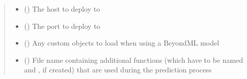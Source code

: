 \documentclass[letterpaper,10pt,english]{sphinxmanual}
\begin{document}
\begin{fulllineitems}
\begin{quote}
\begin{description}
\begin{itemize}
\item {} 
\sphinxAtStartPar
{} (\sphinxstyleliteralemphasis{\sphinxupquote{ (}}\sphinxstyleliteralemphasis{\sphinxupquote{)}}) \textendash{} The host to deploy to

\item {} 
\sphinxAtStartPar
{} (\sphinxstyleliteralemphasis{\sphinxupquote{ (}}\sphinxstyleliteralemphasis{\sphinxupquote{)}}) \textendash{} The port to deploy to

\item {} 
\sphinxAtStartPar
{} (\sphinxstyleliteralemphasis{\sphinxupquote{ (}}\sphinxstyleliteralemphasis{\sphinxupquote{)}}) \textendash{} Any custom objects to load when using a BeyondML model

\item {} 
\sphinxAtStartPar
{} (\sphinxstyleliteralemphasis{\sphinxupquote{ (}}\sphinxstyleliteralemphasis{\sphinxupquote{)}}) \textendash{} File name containing additional functions (which have to be named  and , if created)
that are used during the prediction process

\end{itemize}

\end{description}\end{quote}

\end{fulllineitems}

\end{document}
